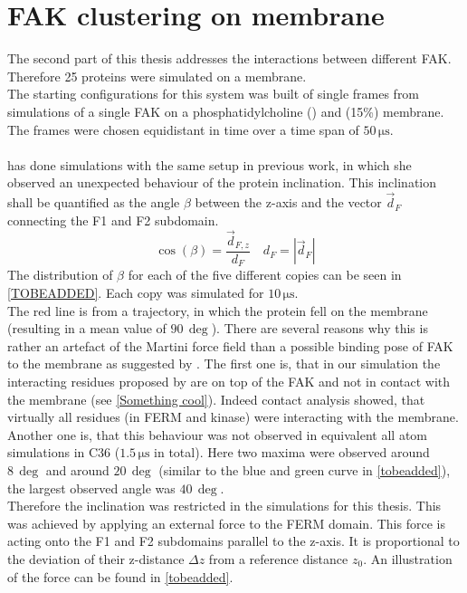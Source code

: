 \section{FAK clustering on membrane}
\label{setup:fakcluster}
The second part of this thesis addresses the interactions between different FAK. Therefore 25 proteins were simulated on a membrane.\\
The starting configurations for this system was built of single frames from simulations of a single FAK on a phosphatidylcholine (\popc{}) and \pip{} (15\%) membrane. The frames were chosen equidistant in time over a time span of $50\,\si{\micro\second}$.\\
\\
\textcite{SARA} has done simulations with the same setup in previous work, in which she observed an unexpected behaviour of the protein inclination. This inclination shall be quantified as the angle $\beta$ between the z-axis and the vector $\vec{d}_F$ connecting the F1 and F2 subdomain.
\begin{equation}
	\cos\left(\beta\right) = \frac{\vec{d}_{F, z}}{d_F}\quad d_F = \left|\vec{d}_F\right|
\end{equation}
The distribution of $\beta$ for each of the five different copies can be seen in \autoref{TOBEADDED}. Each copy was simulated for $10\,\si{\micro\second}$.\\
The red line is from a trajectory, in which the protein fell on the membrane (resulting in a mean value of $90\,\si{\deg}$). There are several reasons why this is rather an artefact of the Martini force field than a possible binding pose of FAK to the membrane as suggested by \textcite{pap002}. The first one is, that in our simulation the interacting residues proposed by \textcite{pap002} are on top of the FAK and not in contact with the membrane (see \autoref{Something cool}). Indeed contact analysis showed, that virtually all residues (in FERM and kinase) were interacting with the membrane. Another one is, that this behaviour was not observed in equivalent all atom simulations in C36 ($1.5\,\si{\micro\second}$ in total). Here two maxima were observed around $8\,\si{\deg}$ and around $20\,\si{\deg}$ (similar to the blue and green curve in \autoref{tobeadded}), the largest observed angle was $40\,\si{\deg}$.\\
Therefore the inclination was restricted in the simulations for this thesis. This was achieved by applying an external force to the FERM domain. This force is acting onto the F1 and F2 subdomains parallel to the z-axis. It is proportional to the deviation of their z-distance $\Delta z$ from a reference distance $z_0$. An illustration of the force can be found in \autoref{tobeadded}.\\
